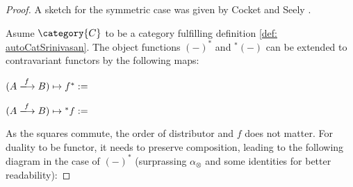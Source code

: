 \documentclass[DIN, pagenumber=false, fontsize=11pt, parskip=half, colorinlistoftodos, svgnames]{scrartcl}
\begin{document}
	\begin{proof}
		A sketch for the symmetric case was given by Cocket and Seely \cite[theorem 4.5]{cockett&seely97}. 
		
		Asume $\category{C}$ to be a category fulfilling definition \ref{def: autoCatSrinivasan}.
		The object functions $(-)^*$ and ${^*(-)}$ can be extended to contravariant functors by the following maps:
		
		\begin{center}
			$(A \xlongrightarrow{f} B) \mapsto f^* := \; $
		\end{center}
		
		\begin{center}
			$(A \xlongrightarrow{f} B) \mapsto {^*f} := \; $
		\end{center}
		
		As the squares commute, the order of distributor and $f$ does not matter. For duality to be functor, it needs to preserve composition, leading to the following diagram in the case of $(-)^*$ (surprassing $\alpha_\otimes$ and some identities for better readability):
		

\end{proof}
\end{document}
